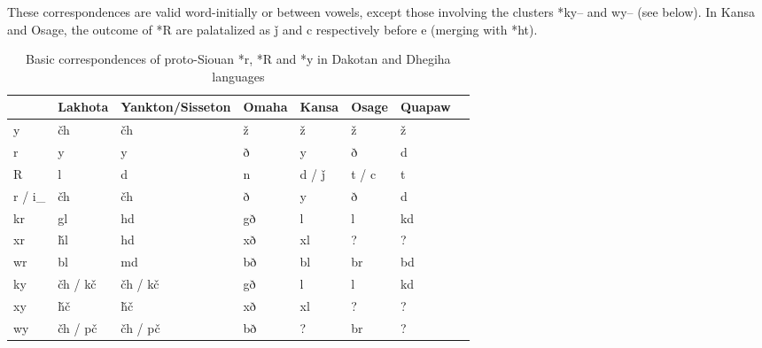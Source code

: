 \documentclass[oldfontcommands,oneside,a4paper,11pt]{article}
\newcommand{\ipa}[1]{{\phon#1}} %
\begin{document}
These correspondences are valid word-initially or between vowels, except those involving the clusters *\ipa{ky--} and \ipa{wy--} (see below). In Kansa and Osage, the outcome of *\ipa{R} are palatalized as \ipa{ǰ} and \ipa{c} respectively before \ipa{e} (merging with *\ipa{ht}).

\begin{table}[h]
\caption{Basic correspondences of proto-Siouan *r, *R and *y in Dakotan and Dhegiha languages} \label{tab:basic} \centering
\begin{tabular}{l|ll|lllll}
\toprule
  & 	Lakhota  & 	Yankton/Sisseton & 	 Omaha  & 	 Kansa  & 	 Osage  & 	 Quapaw  &	\\	
  \midrule
\ipa{*y} & 	\ipa{čh} & 	\ipa{čh} & 	\ipa{ž} & 	\ipa{ž} & 	\ipa{ž} & 	\ipa{ž} & 	\\	
\ipa{*r} & 	\ipa{y} & 	\ipa{y} & 	\ipa{ð} & 	\ipa{y} & 	\ipa{ð} & 	\ipa{d} & 	\\	
\ipa{*R } & 	\ipa{l} & 	\ipa{d} & 	\ipa{n} & 	\ipa{d / ǰ} & 	\ipa{t / c} & 	\ipa{t} & 	\\	
\ipa{*r / i\_} & 	\ipa{čh} & 	\ipa{čh} & 	\ipa{ð} & 	\ipa{y} & 	\ipa{ð} & 	\ipa{d} & 	\\	
\midrule
\ipa{*kr} & 	\ipa{gl} & 	\ipa{hd} & 	\ipa{gð} & 	\ipa{l} & 	\ipa{l} & 	\ipa{kd} & 	\\		
\ipa{*xr} & 	\ipa{ȟl} & 	\ipa{hd} & 	\ipa{xð} & 	\ipa{xl} & 	? & 	? & 	\\		
\ipa{*wr} & 	\ipa{bl} & 	\ipa{md} & 	\ipa{bð} & 	\ipa{bl} & 	\ipa{br} & 	\ipa{bd} & 	\\		
\midrule
\ipa{*ky} & 	\ipa{čh / kč} & 	\ipa{čh / kč} & 	\ipa{gð} & 	\ipa{l} & 	\ipa{l} & 	\ipa{kd} & 	\\	
\ipa{*xy} & 	\ipa{ȟč} & 	\ipa{ȟč} & 	\ipa{xð} & 	\ipa{xl} & 	? & 	? & 	\\	
\ipa{*wy} & 	\ipa{čh / pč} & 	\ipa{čh / pč} & 	\ipa{bð} & 	? & 	\ipa{br} & 	? & 	\\	
\bottomrule
\end{tabular}
\end{table}
\end{document}
